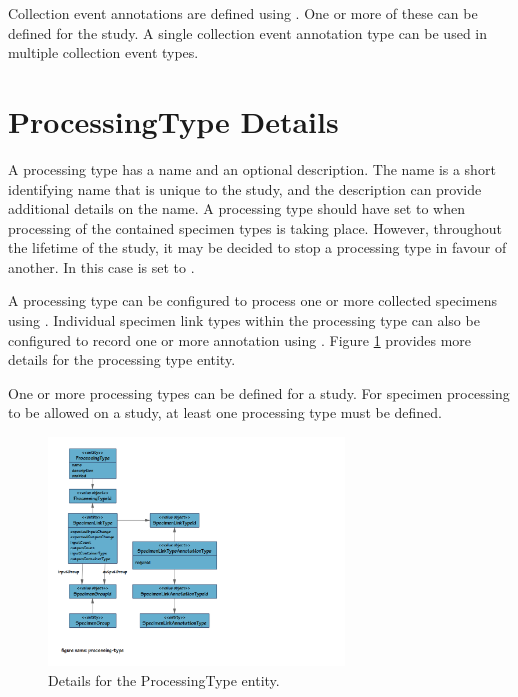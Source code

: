 Collection event annotations are defined using
. One or more of these can be
defined for the study. A single collection event annotation type can be used in
multiple collection event types.

\section{ProcessingType Details}
\label{sec:processing-type}

A processing type has a name and an optional description. The name is a short
identifying name that is unique to the study, and the description can provide
additional details on the name. A processing type should have 
set to  when processing of the contained specimen types is taking
place. However, throughout the lifetime of the study, it may be decided to stop
a processing type in favour of another. In this case  is set to
.

A processing type can be configured to process one or more collected specimens
using . Individual specimen link types within the
processing type can also be configured to record one or more annotation using
. Figure \ref{fig:processing-type}
provides more details for the processing type entity.

One or more processing types can be defined for a study. For specimen
processing to be allowed on a study, at least one processing type must be
defined.

\begin{figure}[H]
  \centering
  \includegraphics[trim={9mm 35mm 120mm 9mm}, clip,
    width=0.7\textwidth]{images/processing-type}
  \caption{Details for the ProcessingType entity.}
  \label{fig:processing-type}
\end{figure}

